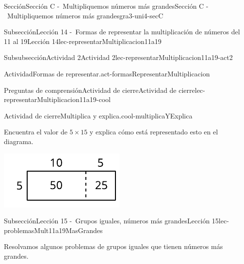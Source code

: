 \documentclass[twoside,10pt,]{article}
\begin{document}
\begin{sectionptx}{Sección}{Sección C -~Multipliquemos números más grandes}{}{Sección C -~Multipliquemos números más grandes}{}{}{gra3-uni4-secC}
\begin{subsectionptx}{Subsección}{Lección 14 -~Formas de representar la multiplicación de números del 11 al 19}{}{Lección 14}{}{}{lec-representarMultiplicacion11a19}
\begin{subsubsectionptx}{Subsubsección}{Actividad 2}{}{Actividad 2}{}{}{lec-representarMultiplicacion11a19-act2}
\begin{activity}{Actividad}{Formas de representar.}{act-formasRepresentarMultiplicacion}
\end{activity}%
\end{subsubsectionptx}
%
%
\typeout{************************************************}
\typeout{************************************************}
%
\begin{reading-questions-subsubsection}{Preguntas de comprensión}{Actividad de cierre}{}{Actividad de cierre}{}{}{lec-representarMultiplicacion11a19-cool}
\begin{project}{Actividad de cierre}{Multiplica y explica.}{cool-multiplicaYExplica}%
\begin{sidebyside}{2}{0}{0}{0}%
\begin{sbspanel}{0.6}%
Encuentra el valor de \(5\times 15\) y explica cómo está representado esto en el diagrama.%
\end{sbspanel}%
\begin{sbspanel}{0.4}%
\includegraphics[width=\linewidth]{external/svg-source/tikz-file-147479-scale13.pdf}
\end{sbspanel}%
\end{sidebyside}%
\end{project}%
\end{reading-questions-subsubsection}
\end{subsectionptx}
%
%
\typeout{************************************************}
\typeout{************************************************}
%
\begin{subsectionptx}{Subsección}{Lección 15 -~Grupos iguales, números más grandes}{}{Lección 15}{}{}{lec-problemasMult11a19MasGrandes}
\begin{introduction}{}%
Resolvamos algunos problemas de grupos iguales que tienen números más grandes.%
\end{introduction}%
%
%
\typeout{************************************************}

\end{subsectionptx}
\end{sectionptx}
\end{document}
